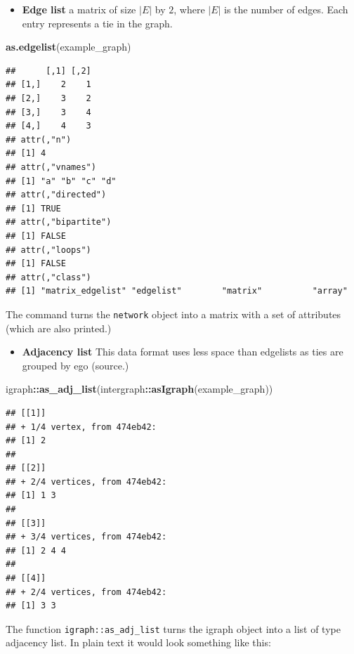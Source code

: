 \documentclass[
]{book}
\newenvironment{Shaded}{\begin{snugshade}}{\end{snugshade}}
\newcommand{\FunctionTok}[1]{\textcolor[rgb]{0.13,0.29,0.53}{\textbf{#1}}}
\newcommand{\NormalTok}[1]{#1}
\newcommand{\SpecialCharTok}[1]{\textcolor[rgb]{0.81,0.36,0.00}{\textbf{#1}}}
\providecommand{\tightlist}{%
  \setlength{\itemsep}{0pt}\setlength{\parskip}{0pt}}
\begin{document}
\begin{itemize}
\tightlist
\item
  \textbf{Edge list} a matrix of size \(|E|\) by \(2\), where \(|E|\) is the number of edges.
  Each entry represents a tie in the graph.
\end{itemize}

\begin{Shaded}
\begin{Highlighting}[]
\FunctionTok{as.edgelist}\NormalTok{(example\_graph)}
\end{Highlighting}
\end{Shaded}

\begin{verbatim}
##      [,1] [,2]
## [1,]    2    1
## [2,]    3    2
## [3,]    3    4
## [4,]    4    3
## attr(,"n")
## [1] 4
## attr(,"vnames")
## [1] "a" "b" "c" "d"
## attr(,"directed")
## [1] TRUE
## attr(,"bipartite")
## [1] FALSE
## attr(,"loops")
## [1] FALSE
## attr(,"class")
## [1] "matrix_edgelist" "edgelist"        "matrix"          "array"
\end{verbatim}

The command turns the \texttt{network} object into a matrix with a set of attributes
(which are also printed.)

\begin{itemize}
\tightlist
\item
  \textbf{Adjacency list} This data format uses less space than edgelists as ties are
  grouped by ego (source.)
\end{itemize}

\begin{Shaded}
\begin{Highlighting}[]
\NormalTok{igraph}\SpecialCharTok{::}\FunctionTok{as\_adj\_list}\NormalTok{(intergraph}\SpecialCharTok{::}\FunctionTok{asIgraph}\NormalTok{(example\_graph)) }
\end{Highlighting}
\end{Shaded}

\begin{verbatim}
## [[1]]
## + 1/4 vertex, from 474eb42:
## [1] 2
## 
## [[2]]
## + 2/4 vertices, from 474eb42:
## [1] 1 3
## 
## [[3]]
## + 3/4 vertices, from 474eb42:
## [1] 2 4 4
## 
## [[4]]
## + 2/4 vertices, from 474eb42:
## [1] 3 3
\end{verbatim}

The function \texttt{igraph::as\_adj\_list} turns the igraph object into a list of
type adjacency list. In plain text it would look something like this:
\end{document}
